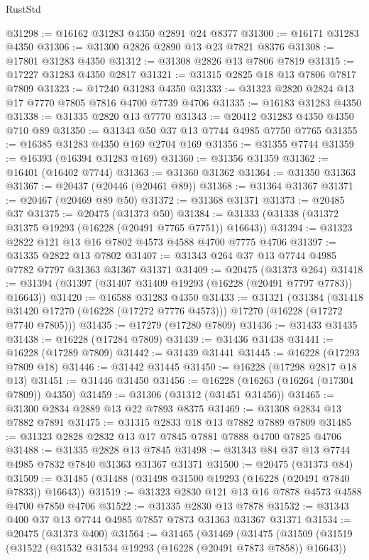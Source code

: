 \begin{lexlean}{RustStd}
\begin{coremodule}
@31298 := @16162 @31283 @4350 @2891 @24 @8377
@31300 := @16171 @31283 @4350
@31306 := @31300 @2826 @2890 @13 @23 @7821 @8376
@31308 := @17801 @31283 @4350
@31312 := @31308 @2826 @13 @7806 @7819
@31315 := @17227 @31283 @4350 @2817
@31321 := @31315 @2825 @18 @13 @7806 @7817 @7809
@31323 := @17240 @31283 @4350
@31333 := @31323 @2820 @2824 @13 @17 @7770 @7805 @7816 @4700 @7739 @4706
@31335 := @16183 @31283 @4350
@31338 := @31335 @2820 @13 @7770
@31343 := @20412 @31283 @4350 @4350 @710 @89
@31350 := @31343 @50 @37 @13 @7744 @4985 @7750 @7765
@31355 := @16385 @31283 @4350 @169 @2704 @169
@31356 := @31355 @7744
@31359 := @16393 (@16394 @31283 @169)
@31360 := @31356 @31359
@31362 := @16401 (@16402 @7744)
@31363 := @31360 @31362
@31364 := @31350 @31363
@31367 := @20437 (@20446 (@20461 @89))
@31368 := @31364 @31367
@31371 := @20467 (@20469 @89 @50)
@31372 := @31368 @31371
@31373 := @20485 @37
@31375 := @20475 (@31373 @50)
@31384 := @31333 (@31338 (@31372 @31375 @19293 (@16228 (@20491 @7765 @7751)) @16643))
@31394 := @31323 @2822 @121 @13 @16 @7802 @4573 @4588 @4700 @7775 @4706
@31397 := @31335 @2822 @13 @7802
@31407 := @31343 @264 @37 @13 @7744 @4985 @7782 @7797 @31363 @31367 @31371
@31409 := @20475 (@31373 @264)
@31418 := @31394 (@31397 (@31407 @31409 @19293 (@16228 (@20491 @7797 @7783)) @16643))
@31420 := @16588 @31283 @4350
@31433 := @31321
    (@31384
      (@31418 @31420 @17270 (@16228 (@17272 @7776 @4573)))
      @17270
      (@16228 (@17272 @7740 @7805)))
@31435 := @17279 (@17280 @7809)
@31436 := @31433 @31435
@31438 := @16228 (@17284 @7809)
@31439 := @31436 @31438
@31441 := @16228 (@17289 @7809)
@31442 := @31439 @31441
@31445 := @16228 (@17293 @7809 @18)
@31446 := @31442 @31445
@31450 := @16228 (@17298 @2817 @18 @13)
@31451 := @31446 @31450
@31456 := @16228 (@16263 (@16264 (@17304 @7809)) @4350)
@31459 := @31306 (@31312 (@31451 @31456))
@31465 := @31300 @2834 @2889 @13 @22 @7893 @8375
@31469 := @31308 @2834 @13 @7882 @7891
@31475 := @31315 @2833 @18 @13 @7882 @7889 @7809
@31485 := @31323 @2828 @2832 @13 @17 @7845 @7881 @7888 @4700 @7825 @4706
@31488 := @31335 @2828 @13 @7845
@31498 := @31343 @84 @37 @13 @7744 @4985 @7832 @7840 @31363 @31367 @31371
@31500 := @20475 (@31373 @84)
@31509 := @31485 (@31488 (@31498 @31500 @19293 (@16228 (@20491 @7840 @7833)) @16643))
@31519 := @31323 @2830 @121 @13 @16 @7878 @4573 @4588 @4700 @7850 @4706
@31522 := @31335 @2830 @13 @7878
@31532 := @31343 @400 @37 @13 @7744 @4985 @7857 @7873 @31363 @31367 @31371
@31534 := @20475 (@31373 @400)
@31564 := @31465
    (@31469
      (@31475
        (@31509
          (@31519
            (@31522 (@31532 @31534 @19293 (@16228 (@20491 @7873 @7858)) @16643))

\end{coremodule}
\end{lexlean}
